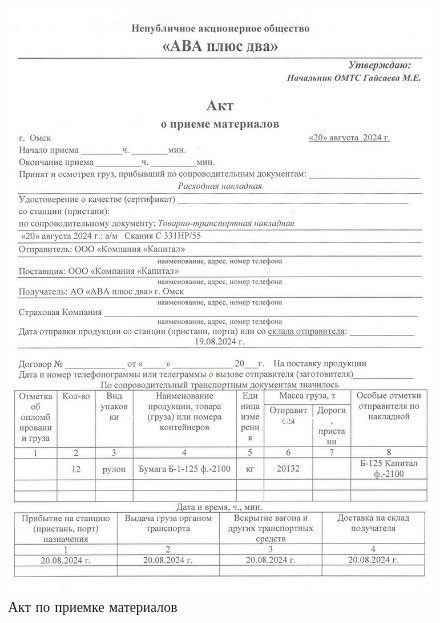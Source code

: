\begin{figure}
\begin{center}
  \includegraphics[height=0.8\textheight, keepaspectratio]{Pics/d33.jpg}
\end{center}
  \caption{Акт по приемке материалов}
  \label{pic:d33}
\end{figure}






